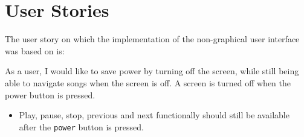 \section{User Stories}
The user story on which the implementation of the non-graphical user interface was based on is:

{As a user, I would like to save power by turning off the screen, while still being able to navigate songs when the screen is off.
A screen is turned off when the power button is pressed.}
{\begin{itemize}
\item Play, pause, stop, previous and next functionally should still be available after the \texttt{power} button is pressed.
\end{itemize}}
